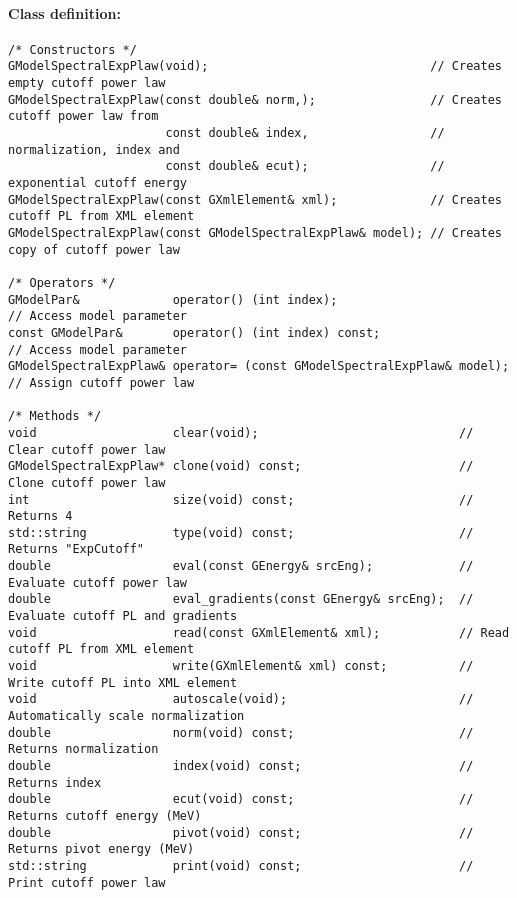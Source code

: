 \documentclass{article}[12pt,a4]
\begin{document}
\paragraph{Class definition:}
\begin{verbatim}
/* Constructors */
GModelSpectralExpPlaw(void);                               // Creates empty cutoff power law
GModelSpectralExpPlaw(const double& norm,);                // Creates cutoff power law from
                      const double& index,                 //   normalization, index and
                      const double& ecut);                 //   exponential cutoff energy
GModelSpectralExpPlaw(const GXmlElement& xml);             // Creates cutoff PL from XML element
GModelSpectralExpPlaw(const GModelSpectralExpPlaw& model); // Creates copy of cutoff power law

/* Operators */
GModelPar&             operator() (int index);                         // Access model parameter
const GModelPar&       operator() (int index) const;                   // Access model parameter
GModelSpectralExpPlaw& operator= (const GModelSpectralExpPlaw& model); // Assign cutoff power law

/* Methods */
void                   clear(void);                            // Clear cutoff power law
GModelSpectralExpPlaw* clone(void) const;                      // Clone cutoff power law
int                    size(void) const;                       // Returns 4
std::string            type(void) const;                       // Returns "ExpCutoff"
double                 eval(const GEnergy& srcEng);            // Evaluate cutoff power law
double                 eval_gradients(const GEnergy& srcEng);  // Evaluate cutoff PL and gradients
void                   read(const GXmlElement& xml);           // Read cutoff PL from XML element
void                   write(GXmlElement& xml) const;          // Write cutoff PL into XML element
void                   autoscale(void);                        // Automatically scale normalization
double                 norm(void) const;                       // Returns normalization
double                 index(void) const;                      // Returns index
double                 ecut(void) const;                       // Returns cutoff energy (MeV)
double                 pivot(void) const;                      // Returns pivot energy (MeV)
std::string            print(void) const;                      // Print cutoff power law
\end{verbatim}
\end{document}
